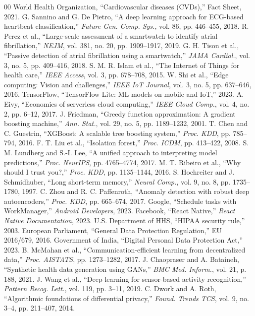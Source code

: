 \documentclass[journal]{IEEEtran}
\begin{document}
\begin{thebibliography}{00}
 World Health Organization, ``Cardiovascular diseases (CVDs),'' Fact Sheet, 2021.
 G. Sannino and G. De Pietro, ``A deep learning approach for ECG-based heartbeat classification,'' \textit{Future Gen. Comp. Sys.}, vol. 86, pp. 446--455, 2018.
 R. Perez et al., ``Large-scale assessment of a smartwatch to identify atrial fibrillation,'' \textit{NEJM}, vol. 381, no. 20, pp. 1909--1917, 2019.
 G. H. Tison et al., ``Passive detection of atrial fibrillation using a smartwatch,'' \textit{JAMA Cardiol.}, vol. 3, no. 5, pp. 409--416, 2018.
 S. M. R. Islam et al., ``The Internet of Things for health care,'' \textit{IEEE Access}, vol. 3, pp. 678--708, 2015.
 W. Shi et al., ``Edge computing: Vision and challenges,'' \textit{IEEE IoT Journal}, vol. 3, no. 5, pp. 637--646, 2016.
 TensorFlow, ``TensorFlow Lite: ML models on mobile and IoT,'' 2023.
 A. Eivy, ``Economics of serverless cloud computing,'' \textit{IEEE Cloud Comp.}, vol. 4, no. 2, pp. 6--12, 2017.
 J. Friedman, ``Greedy function approximation: A gradient boosting machine,'' \textit{Ann. Stat.}, vol. 29, no. 5, pp. 1189--1232, 2001.
 T. Chen and C. Guestrin, ``XGBoost: A scalable tree boosting system,'' \textit{Proc. KDD}, pp. 785--794, 2016.
 F. T. Liu et al., ``Isolation forest,'' \textit{Proc. ICDM}, pp. 413--422, 2008.
 S. M. Lundberg and S.-I. Lee, ``A unified approach to interpreting model predictions,'' \textit{Proc. NeurIPS}, pp. 4765--4774, 2017.
 M. T. Ribeiro et al., ``Why should I trust you?,'' \textit{Proc. KDD}, pp. 1135--1144, 2016.
 S. Hochreiter and J. Schmidhuber, ``Long short-term memory,'' \textit{Neural Comp.}, vol. 9, no. 8, pp. 1735--1780, 1997.
 C. Zhou and R. C. Paffenroth, ``Anomaly detection with robust deep autoencoders,'' \textit{Proc. KDD}, pp. 665--674, 2017.
 Google, ``Schedule tasks with WorkManager,'' \textit{Android Developers}, 2023.
 Facebook, ``React Native,'' \textit{React Native Documentation}, 2023.
 U.S. Department of HHS, ``HIPAA security rule,'' 2003.
 European Parliament, ``General Data Protection Regulation,'' EU 2016/679, 2016.
 Government of India, ``Digital Personal Data Protection Act,'' 2023.
 B. McMahan et al., ``Communication-efficient learning from decentralized data,'' \textit{Proc. AISTATS}, pp. 1273--1282, 2017.
 J. Chaopraser and A. Bataineh, ``Synthetic health data generation using GANs,'' \textit{BMC Med. Inform.}, vol. 21, p. 188, 2021.
 J. Wang et al., ``Deep learning for sensor-based activity recognition,'' \textit{Pattern Recog. Lett.}, vol. 119, pp. 3--11, 2019.
 C. Dwork and A. Roth, ``Algorithmic foundations of differential privacy,'' \textit{Found. Trends TCS}, vol. 9, no. 3--4, pp. 211--407, 2014.
\end{thebibliography}
\end{document}
